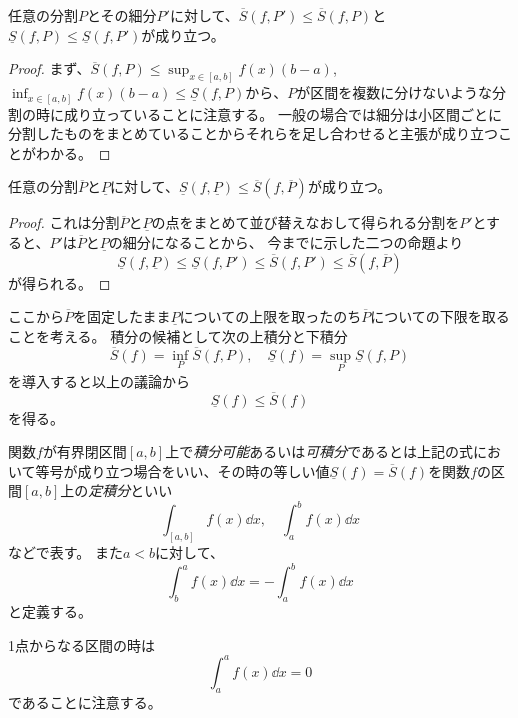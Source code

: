 \begin{proposition}
任意の分割$P$とその細分$P'$に対して、$\overline{S}(f, P') \le \overline{S}(f, P)$と$\underline{S}(f, P) \le \underline{S}(f, P')$が成り立つ。
\end{proposition}

\begin{proof}
まず、$\overline{S}(f, P) \le \sup_{x \in [a, b]}f(x)(b-a)$, $\inf_{x \in [a, b]}f(x)(b-a) \le \underline{S}(f, P)$から、$P$が区間を複数に分けないような分割の時に成り立っていることに注意する。
一般の場合では細分は小区間ごとに分割したものをまとめていることからそれらを足し合わせると主張が成り立つことがわかる。
\end{proof}

\begin{proposition}
任意の分割$\overline{P}$と$\underline{P}$に対して、$\underline{S}(f, \underline{P}) \le \overline{S}(f, \overline{P})$が成り立つ。
\end{proposition}

\begin{proof}
これは分割$\overline{P}$と$\underline{P}$の点をまとめて並び替えなおして得られる分割を$P'$とすると、$P'$は$\overline{P}$と$\underline{P}$の細分になることから、
今までに示した二つの命題より
$$
\underline{S}(f, \underline{P}) \le \underline{S}(f, P') \le \overline{S}(f, P') \le \overline{S}(f, \overline{P})
$$
が得られる。
\end{proof}

ここから$\overline{P}$を固定したまま$\underline{P}$についての上限を取ったのち$\overline{P}$についての下限を取ることを考える。
積分の候補として次の上積分と下積分
$$
\overline{S}(f) = \inf_P \overline{S}(f, P),
\quad \underline{S}(f) = \sup_P \underline{S}(f, P)
$$
を導入すると以上の議論から
$$
\underline{S}(f) \le \overline{S}(f)
$$
を得る。

\begin{definition}[定積分]
関数$f$が有界閉区間$[a, b]$上で\emph{積分可能}あるいは\emph{可積分}であるとは上記の式において等号が成り立つ場合をいい、その時の等しい値$\underline{S}(f) = \overline{S}(f)$を関数$f$の区間$[a, b]$上の\emph{定積分}といい
$$
\int_{[a, b]} f(x)\dd{x},
\quad \int_a^b f(x)\dd{x}
$$
などで表す。
また$a < b$に対して、
$$
\int_b^a f(x)\dd{x} = -\int_a^b f(x)\dd{x}
$$
と定義する。
\end{definition}

\begin{remark}
1点からなる区間の時は
$$
\int_a^a f(x)\dd{x} = 0
$$
であることに注意する。
\end{remark}

